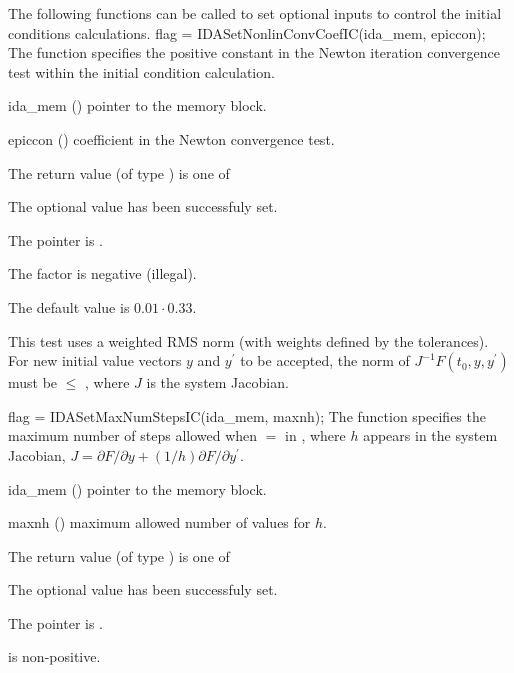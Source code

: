 The following functions can be called to set optional inputs to control the initial 
conditions calculations.
{
flag = IDASetNonlinConvCoefIC(ida\_mem, epiccon);
}
{
  The function  specifies the positive constant in
  the Newton iteration convergence test within the initial condition calculation.
}
{
  \begin{args}
  \item[ida\_mem] ()
    pointer to the {\ida} memory block.
  \item[epiccon] ()
    coefficient in the Newton convergence test.
  \end{args}
}
{
  The return value  (of type ) is one of
  \begin{args}
  \item[\Id{IDA\_SUCCESS}] 
    The optional value has been successfuly set.
  \item[\Id{IDA\_MEM\_NULL}]
    The  pointer is .
  \item[\Id{IDA\_ILL\_INPUT}]
    The  factor is negative (illegal).
  \end{args}
}
{
  The default value is $0.01 \cdot 0.33$.

  This test uses a weighted RMS norm (with weights defined by the tolerances).
  For new initial value vectors $y$ and $y^\prime$ to be accepted, the norm
  of $J^{-1}F(t_0, y, y^\prime)$ must be $\le$ , where $J$ is the
  system Jacobian.
}
{
flag = IDASetMaxNumStepsIC(ida\_mem, maxnh);
}
{
  The function  specifies the maximum number
  of steps allowed when $=$
  in , where $h$ appears in the system Jacobian,
  $J = \partial F / \partial y + (1/h) \partial F / \partial y^\prime$.
}
{
  \begin{args}
  \item[ida\_mem] ()
    pointer to the {\ida} memory block.
  \item[maxnh] ()
    maximum allowed number of values for $h$.
  \end{args}
}
{
  The return value  (of type ) is one of
  \begin{args}
  \item[\Id{IDA\_SUCCESS}] 
    The optional value has been successfuly set.
  \item[\Id{IDA\_MEM\_NULL}]
    The  pointer is .
  \item[\Id{IDA\_ILL\_INPUT}]
     is non-positive.
  \end{args}
}

